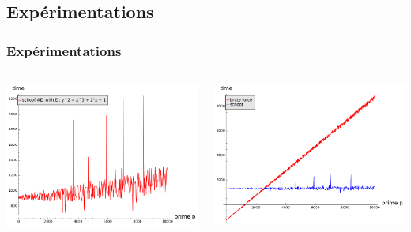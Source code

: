 \documentclass{beamer}
\begin{document}
\subsection{Expérimentations}
\begin{frame}
\frametitle{Expérimentations}
\begin{columns}[T]
	\begin{column}{5cm}
		\includegraphics[scale=0.4]{../pictures/schoof_cputime.png} 
	\end{column}
	\begin{column}{5cm}
		\includegraphics[scale=0.4]{../pictures/schoof_vs_bruteforce.png} 
	\end{column}
\end{columns}
\end{frame}
\end{document}

